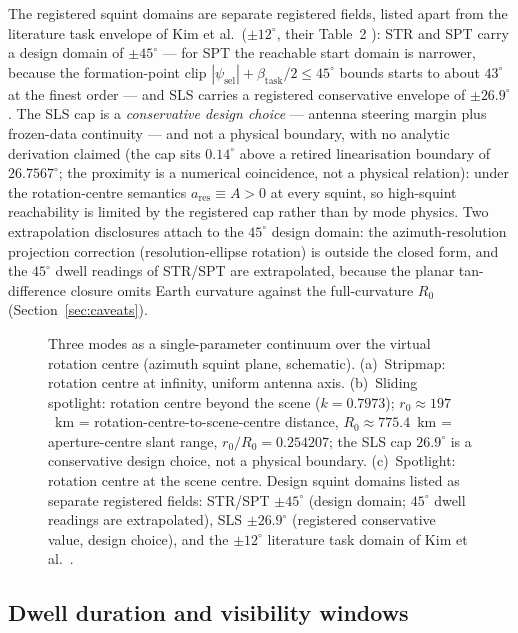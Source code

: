 \documentclass[preprint,authoryear]{elsarticle}
\begin{document}
The registered squint domains are separate registered fields, listed apart from the literature task envelope of Kim et al.\ ($\pm 12^{\circ}$, their Table~2 \citep{kim2021optimal}): STR and SPT carry a design domain of $\pm 45^{\circ}$ --- for SPT the reachable start domain is narrower, because the formation-point clip $|\psi_{\mathrm{sel}}|+\beta_{\mathrm{task}}/2\le 45^{\circ}$ bounds starts to about $43^{\circ}$ at the finest order --- and SLS carries a registered conservative envelope of $\pm 26.9^{\circ}$. The SLS cap is a \emph{conservative design choice} --- antenna steering margin plus frozen-data continuity --- and not a physical boundary, with no analytic derivation claimed (the cap sits $0.14^{\circ}$ above a retired linearisation boundary of $26.7567^{\circ}$; the proximity is a numerical coincidence, not a physical relation): under the rotation-centre semantics $a_{\mathrm{res}}\equiv A>0$ at every squint, so high-squint reachability is limited by the registered cap rather than by mode physics. Two extrapolation disclosures attach to the $45^{\circ}$ design domain: the azimuth-resolution projection correction (resolution-ellipse rotation) is outside the closed form, and the $45^{\circ}$ dwell readings of STR/SPT are extrapolated, because the planar tan-difference closure omits Earth curvature against the full-curvature $R_0$ (Section~\ref{sec:caveats}).

\begin{figure}[!t]
\centering

\caption{Three modes as a single-parameter continuum over the virtual rotation centre (azimuth squint plane, schematic). (a)~Stripmap: rotation centre at infinity, uniform antenna axis. (b)~Sliding spotlight: rotation centre beyond the scene ($k=0.7973$); $r_0\approx 197$~km = rotation-centre-to-scene-centre distance, $R_0\approx 775.4$~km = aperture-centre slant range, $r_0/R_0=0.254207$; the SLS cap $26.9^{\circ}$ is a conservative design choice, not a physical boundary. (c)~Spotlight: rotation centre at the scene centre. Design squint domains listed as separate registered fields: STR/SPT $\pm 45^{\circ}$ (design domain; $45^{\circ}$ dwell readings are extrapolated), SLS $\pm 26.9^{\circ}$ (registered conservative value, design choice), and the $\pm 12^{\circ}$ literature task domain of Kim et al.\ \citep{kim2021optimal}.}
\label{fig:modes}
\end{figure}

\subsection{Dwell duration and visibility windows}\label{sec:dwell}
\end{document}
